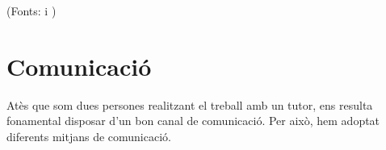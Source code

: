 (Fonts:\cite{Comparacionsentrecontroldeversions} i \cite{blocdecriticad'undesenvolupador})

\section{Comunicació} \label{sec:4.1}

Atès que som dues persones realitzant el treball amb un tutor, ens resulta fonamental disposar d'un bon canal de comunicació. Per això, hem adoptat diferents mitjans de comunicació.

